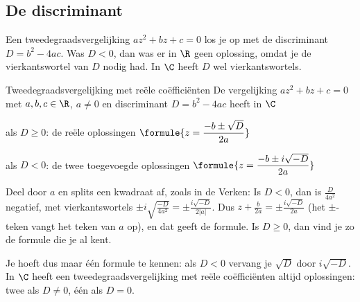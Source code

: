 \subsection{De discriminant}

Een tweedegraadsvergelijking $az^2 + bz + c = 0$ los je op met de discriminant $D = b^2 - 4ac$. Was $D < 0$, dan was er in $\R$ geen oplossing, omdat je de vierkantswortel van $D$ nodig had. In $\C$ heeft $D$ wel vierkantswortels.

\begin{theorie}
\begin{stelling}{Tweedegraadsvergelijking met reële coëfficiënten}
De vergelijking $az^2 + bz + c = 0$ met $a, b, c \in \R$, $a \neq 0$ en discriminant $D = b^2 - 4ac$ heeft in $\C$

\vspace{1mm}
als $D \geqslant 0$: de reële oplossingen \quad $\formule{z = \dfrac{-b \pm \sqrt{D}}{2a}}$

\vspace{1mm}
als $D < 0$: de twee toegevoegde oplossingen \quad $\formule{z = \dfrac{-b \pm i\sqrt{-D}}{2a}}$
\end{stelling}

\begin{bewijs}
Deel door $a$ en splits een kwadraat af, zoals in de Verken:
Is $D < 0$, dan is $\frac{D}{4a^2}$ negatief, met vierkantswortels $\pm i\sqrt{\frac{-D}{4a^2}} = \pm \frac{i\sqrt{-D}}{2|a|}$. Dus $z + \frac{b}{2a} = \pm\frac{i\sqrt{-D}}{2a}$ (het $\pm$-teken vangt het teken van $a$ op), en dat geeft de formule. Is $D \geqslant 0$, dan vind je zo de formule die je al kent.
\end{bewijs}
\end{theorie}

Je hoeft dus maar één formule te kennen: als $D < 0$ vervang je $\sqrt{D}$ door $i\sqrt{-D}$. In $\C$ heeft een tweedegraadsvergelijking met reële coëfficiënten altijd oplossingen: twee als $D \neq 0$, één als $D = 0$.


